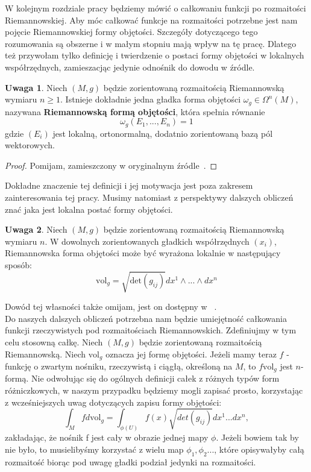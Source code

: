 \documentclass[licencjacka]{pracamgr}
\theoremstyle{definition}
\theoremstyle{definition}
\newtheorem{remark}{Uwaga}[section]
\theoremstyle{plain}
\theoremstyle{plain}
\theoremstyle{plain}
\theoremstyle{plain}
\theoremstyle{plain}
\begin{document}
W kolejnym rozdziale pracy będziemy mówić o całkowaniu funkcji po rozmaitości
Riemannowskiej.  Aby móc całkować funkcje na rozmaitości potrzebne jest nam
pojęcie Riemannowskiej formy objętości. Szczegóły dotyczącego tego rozumowania
są obszerne i w małym stopniu mają wpływ na tę pracę. Dlatego też przywołam
tylko definicję i twierdzenie o postaci formy objętości w lokalnych
współrzędnych, zamieszacjąc jedynie odnośnik do dowodu w źródle. \\

\begin{remark}
Niech $(M, g)$ będzie zorientowaną rozmaitością Riemannowską wymiaru
$n \geq 1$. Istnieje dokładnie jedna gładka forma objętości
$\omega_g \in \Omega^n(M)$, nazywana \textbf{Riemannowską formą objętości},
która spełnia równanie
\[
\omega_g(E_1, ...,  E_n) = 1
\]
gdzie $(E_i)$ jest lokalną, ortonormalną, dodatnio zorientowaną bazą
pól wektorowych.
\end{remark}
\begin{proof}
Pomijam, zamieszczony w oryginalnym źródle~\cite[Proposition 15.29]{lee}.
\end{proof}
Dokładne znaczenie tej definicji i jej motywacja jest poza
zakresem zainteresowania tej pracy. Musimy natomiast z perspektywy
dalszych obliczeń znać jaka jest lokalna postać formy objętości. \\

\begin{remark}\label{expression-for-volume-form}
Niech $(M, g)$ będzie zorientowaną rozmaitością Riemannowską wymiaru $n$.
 W dowolnych zorientowanych gładkich współrzędnych
$(x_i)$, Riemannowska forma objętości może być wyrażona lokalnie w następujący
sposób:
\[
    \text{vol}_g = \sqrt{\text{det}(g_{ij})} dx^1 \wedge ... \wedge dx^n
\]
\end{remark}
Dowód tej własności także omijam, jest on dostępny w ~\cite[Proposition
15.31]{lee}. \\

Do naszych dalszych obliczeń potrzebna nam będzie umiejętność całkowania
funkcji rzeczywistych pod rozmaitościach Riemannowskich. Zdefiniujmy w tym celu
stosowną całkę.
Niech $(M, g)$ będzie zorientowaną rozmaitością Riemannowską. 
Niech $\text{vol}_g$ oznacza jej formę objętości. Jeżeli mamy teraz $f$ -
funkcję o zwartym nośniku, rzeczywistą i ciągłą, określoną na $M$, to
$f \text{vol}_g$ jest $n$-formą.
Nie odwołując się do ogólnych definicji całek z różnych typów form
różniczkowych, w naszym przypadku będziemy mogli zapisać prosto, korzystając z
wcześniejszych uwag dotyczących zapisu formy objętości:
\[ %
  \int_M f d \text{vol}_g = \int_{\phi (U)} f(x) \sqrt{det(g_{ij})} dx^1 ... dx^n,
\]
zakładając, że nośnik f jest cały w obrazie jednej mapy
$\phi$. Jeżeli bowiem tak by nie było, to musielibyśmy korzystać z
wielu map $\phi_1, \phi_2 ... $, które opisywałyby całą rozmaitość
biorąc pod uwagę gładki podział jedynki na rozmaitości. \\
\end{document}
